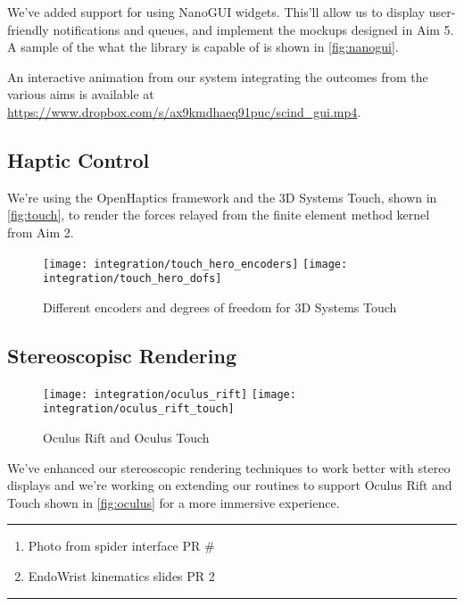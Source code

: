 We've added support for  using NanoGUI widgets. This'll allow us to display user-friendly notifications and queues, and implement the mockups designed in Aim 5. A sample of the what the library is capable of is shown in \autoref{fig:nanogui}.

An interactive animation from our system integrating the outcomes from the various aims is available at \url{https://www.dropbox.com/s/ax9kmdhaeq91puc/scind_gui.mp4}.

\subsection{Haptic Control}
\label{ssec:haptic}
We're using the OpenHaptics framework and the 3D Systems Touch, shown in \autoref{fig:touch}, to render the forces relayed from the finite element method kernel from Aim 2.

\begin{figure}
  \centering%
  \texttt{[image: integration/touch\_hero\_encoders]}
  \hfill%
  \texttt{[image: integration/touch\_hero\_dofs]}
  \caption{Different encoders and degrees of freedom for 3D Systems Touch}
  \label{fig:touch}
\end{figure}

\subsection{Stereoscopisc Rendering}
\label{ssec:stereo}
\begin{figure}
  \centering%
  \texttt{[image: integration/oculus\_rift]}
  \hfill%
  \texttt{[image: integration/oculus\_rift\_touch]}
  \caption{Oculus Rift and Oculus Touch}
  \label{fig:oculus}
\end{figure}

We've enhanced our stereoscopic rendering techniques to work better with stereo displays and we're working on extending our routines to support Oculus Rift and Touch shown in \autoref{fig:oculus} for a more immersive experience.

\hrule%

\begin{enumerate}
  \item Photo from spider interface PR \#
  \item EndoWrist kinematics slides PR 2
\end{enumerate}

\hrule%

